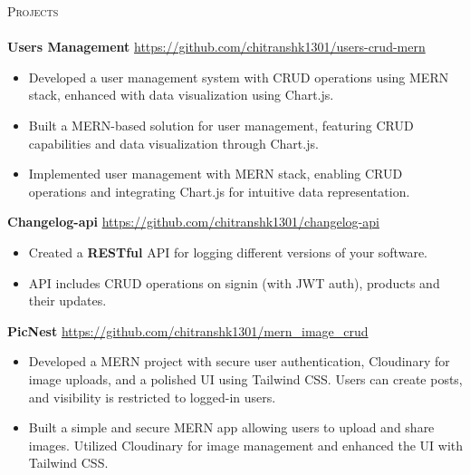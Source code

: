 \documentclass[a4paper]{article}
\newcommand{\lineunder} {
    \vspace*{-8pt} \\
    \hspace*{-18pt} \hrulefill \\
}
\newcommand{\header} [1] {
    {\hspace*{-18pt}\vspace*{6pt} \textsc{#1}}
    \vspace*{-6pt} \lineunder
}
\begin{document}
    \header{Projects}

{\textbf{Users Management}} \hfill
\vspace{-1mm}
\url{https://github.com/chitranshk1301/users-crud-mern}
\vspace{-1mm}
\begin{itemize} 
    \item Developed a user management system with CRUD operations using MERN stack, enhanced with data visualization using Chart.js.
    \item Built a MERN-based solution for user management, featuring CRUD capabilities and data visualization through Chart.js.
    \item Implemented user management with MERN stack, enabling CRUD operations and integrating Chart.js for intuitive data representation.
    
\end{itemize}

{\textbf{Changelog-api}} \hfill
\vspace{-1mm}
\url{https://github.com/chitranshk1301/changelog-api}
\vspace{-1mm}
\begin{itemize} 
    \item Created a \textbf{RESTful} API for logging different versions of your software.
    \item API includes CRUD operations on signin (with JWT auth), products and their updates.
    
\end{itemize}

{\textbf{PicNest}} \hfill
\vspace{-1mm}
\url{https://github.com/chitranshk1301/mern_image_crud}
\vspace{-1mm}
\begin{itemize}
    \item Developed a MERN project with secure user authentication, Cloudinary for image uploads, and a polished UI using Tailwind CSS. Users can create posts, and visibility is restricted to logged-in users.
    \vspace{-2mm}
    \item Built a simple and secure MERN app allowing users to upload and share images. Utilized Cloudinary for image management and enhanced the UI with Tailwind CSS.
\end{itemize}
\end{document}
